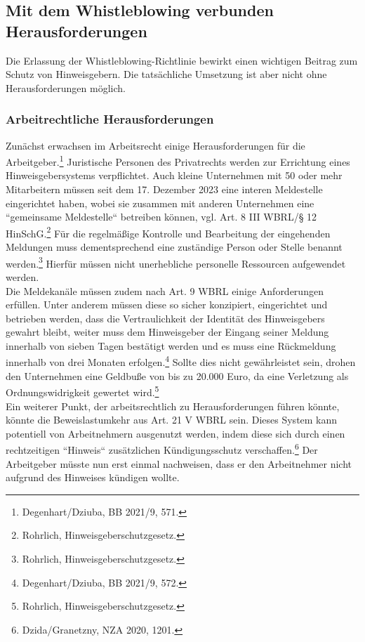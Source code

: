 \subsection{Mit dem Whistleblowing verbunden Herausforderungen}
Die Erlassung der Whistleblowing-Richtlinie bewirkt einen wichtigen Beitrag zum Schutz von Hinweisgebern. Die tatsächliche Umsetzung ist aber nicht ohne Herausforderungen möglich.

\subsubsection{Arbeitrechtliche Herausforderungen}
Zunächst erwachsen im Arbeitsrecht einige Herausforderungen für die Arbeitgeber.\footnote{Degenhart/Dziuba, BB 2021/9, 571.}
Juristische Personen des Privatrechts werden zur Errichtung eines Hinweisgebersystems verpflichtet.
Auch kleine Unternehmen mit 50 oder mehr Mitarbeitern müssen seit dem 17. Dezember 2023 eine interen Meldestelle eingerichtet haben, wobei sie zusammen mit anderen Unternehmen eine “gemeinsame Meldestelle“ betreiben können, vgl. Art. 8 III WBRL/§ 12 HinSchG.\footnote{Rohrlich, Hinweisgeberschutzgesetz.}
Für die regelmäßige Kontrolle und Bearbeitung der eingehenden Meldungen muss dementsprechend eine zuständige Person oder Stelle benannt werden.\footnote{Rohrlich, Hinweisgeberschutzgesetz.}
Hierfür müssen nicht unerhebliche personelle Ressourcen aufgewendet werden.\\
Die Meldekanäle müssen zudem nach Art. 9 WBRL einige Anforderungen erfüllen. 
Unter anderem müssen diese so sicher konzipiert, eingerichtet und betrieben werden, dass die Vertraulichkeit der Identität des Hinweisgebers gewahrt bleibt, weiter muss dem Hinweisgeber der Eingang seiner Meldung innerhalb von sieben Tagen bestätigt werden und es muss eine Rückmeldung innerhalb von drei Monaten erfolgen.\footnote{Degenhart/Dziuba, BB 2021/9, 572.}
Sollte dies nicht gewährleistet sein, drohen den Unternehmen eine Geldbuße von bis zu 20.000 Euro, da eine Verletzung als Ordnungswidrigkeit gewertet wird.\footnote{Rohrlich, Hinweisgeberschutzgesetz.}\\
Ein weiterer Punkt, der arbeitsrechtlich zu Herausforderungen führen könnte, könnte die Beweislastumkehr aus Art. 21 V WBRL sein.
Dieses System kann potentiell von Arbeitnehmern ausgenutzt werden, indem diese sich durch einen rechtzeitigen “Hinweis“ zusätzlichen Kündigungsschutz verschaffen.\footnote{Dzida/Granetzny, NZA 2020, 1201.}
Der Arbeitgeber müsste nun erst einmal nachweisen, dass er den Arbeitnehmer nicht aufgrund des Hinweises kündigen wollte.
